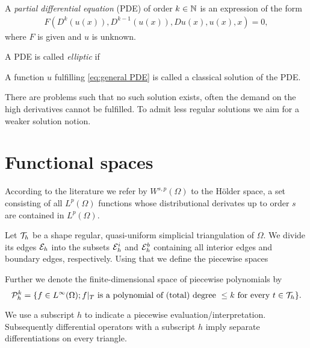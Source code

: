 
\begin{definition}
 A \emph{partial differential equation} (PDE) of order $k\in \mathbb{N}$ is an expression of the form
\begin{align}
	F(D^k(u(x)), D^{k-1}(u(x)), Du(x), u(x), x) = 0, \label{eq:general PDE}
\end{align}
where $F$ is given and $u$ is unknown.
\end{definition}


\begin{definition}
	A PDE is called \emph{elliptic} if 
	
\end{definition}

A function $u$ fulfilling \eqref{eq:general PDE} is called a classical solution of the PDE.

There are problems such that no such solution exists, often the demand on the high derivatives cannot be fulfilled. To admit less regular solutions we aim for a weaker solution notion.


\section{Functional spaces}

According to the literature we refer by $W^{s,p}(\Omega)$ to the H\"older space, a set consisting of all $L^p(\Omega)$ functions whose distributional derivates up to order $s$ are contained in $L^ p(\Omega)$.

Let $\mathcal{T}_h$ be a shape regular, quasi-uniform simplicial triangulation of $\Omega$. We divide its edges $\mathcal{E}_h$ into the subsets $\mathcal{E}_h^i$ and $\mathcal{E}_h^b$ containing all interior edges and boundary edges, respectively.
Using that we define the piecewise spaces
\begin{definition} \label{def: piecewise polySpace}
	Further we denote the finite-dimensional space of piecewise polynomials by
\[	
	\mathcal P^k_h = \{ f \in L^\infty(\Omega); f \arrowvert_T \textnormal{ is a polynomial of (total) degree } \leq k \textnormal{ for every } t \in \mathcal T_h\}.
\]
\end{definition}

We use a subscript $h$ to indicate a piecewise evaluation/interpretation. Subsequently differential operators with a subscript $h$ imply separate differentiations on every triangle.


